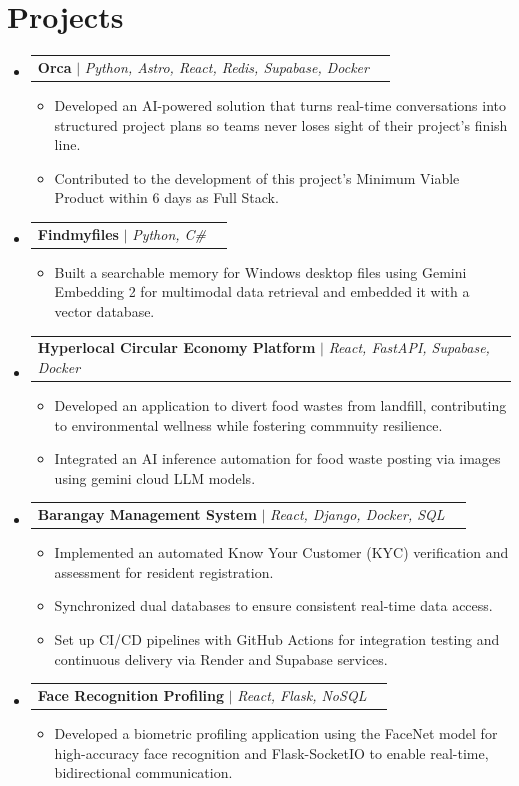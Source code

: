 \documentclass[letterpaper,11pt]{article}
\makeatletter
\newcommand{\resumeItem}[1]{
  \item\small{
    {#1 \vspace{0pt}}
  }
}
\newcommand{\resumeProjectHeading}[2]{
    \item
    \begin{tabular*}{1.001\textwidth}{l@{\extracolsep{\fill}}r}
      \small#1 & \textbf{\small #2}\\
    \end{tabular*}\vspace{-7pt}
}
\newcommand{\resumeSubHeadingListStart}{\begin{itemize}[leftmargin=0.0in, label={}]}
\newcommand{\resumeSubHeadingListEnd}{\end{itemize}}\vspace{0pt}
\newcommand{\resumeItemListStart}{\begin{itemize}}
\newcommand{\resumeItemListEnd}{\end{itemize}\vspace{-5pt}}
\makeatother
\begin{document}
\section{Projects} 
    \vspace{-5pt}
    \resumeSubHeadingListStart
    \resumeProjectHeading{\textbf{Orca} $|$ \emph{Python, Astro, React, Redis, Supabase, Docker}}{}
      \resumeItemListStart
        \resumeItem{Developed an AI-powered solution that turns real-time conversations into structured project plans so teams never loses sight of their project's finish line.}
        \resumeItem{Contributed to the development of this project's Minimum Viable Product within 6 days as Full Stack.}
      \resumeItemListEnd
    \vspace{-20pt}
    \resumeProjectHeading{\textbf{Findmyfiles} $|$ \emph{Python, C\#}}{}
      \resumeItemListStart
        \resumeItem{Built a searchable memory for Windows desktop files using Gemini Embedding 2 for multimodal data retrieval and embedded it with a vector database.}
      \resumeItemListEnd
    \vspace{-20pt}
    \resumeProjectHeading{\textbf{Hyperlocal Circular Economy Platform} $|$ \emph{React, FastAPI, Supabase, Docker}}{}
      \resumeItemListStart
        \resumeItem{Developed an application to divert food wastes from landfill, contributing to environmental wellness while fostering commnuity resilience.}
        \resumeItem{Integrated an AI inference automation for food waste posting via images using gemini cloud LLM models.}
      \resumeItemListEnd
    \vspace{-20pt}
    \resumeProjectHeading
      {\textbf{Barangay Management System} $|$ \emph{React, Django, Docker, SQL}}{}
      \resumeItemListStart
        \resumeItem{Implemented an automated Know Your Customer (KYC) verification and assessment for resident registration.}
        \resumeItem{Synchronized dual databases to ensure consistent real-time data access.}
        \resumeItem{Set up CI/CD pipelines with GitHub Actions for integration testing and continuous delivery via Render and Supabase services.}
      \resumeItemListEnd
    \vspace{-20pt}
    \resumeProjectHeading
      {\textbf{Face Recognition Profiling} $|$ \emph{React, Flask, NoSQL}}{}
      \resumeItemListStart
        \resumeItem{Developed a biometric profiling application using the FaceNet model for high-accuracy face recognition and Flask-SocketIO to enable real-time, bidirectional communication.}
      \resumeItemListEnd
\resumeSubHeadingListEnd
\vspace{-12pt}



\vspace{-15pt}
\end{document}
